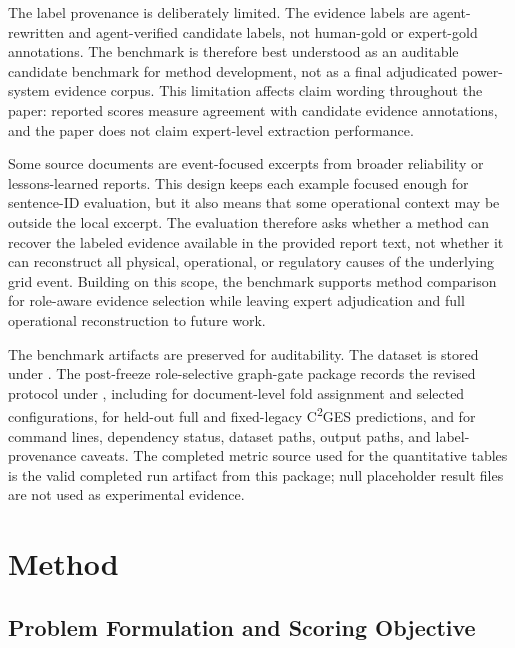 \documentclass{ieeeaccess}
\begin{document}
The label provenance is deliberately limited. The evidence labels are agent-rewritten and agent-verified candidate labels, not human-gold or expert-gold annotations. The benchmark is therefore best understood as an auditable candidate benchmark for method development, not as a final adjudicated power-system evidence corpus. This limitation affects claim wording throughout the paper: reported scores measure agreement with candidate evidence annotations, and the paper does not claim expert-level extraction performance.

Some source documents are event-focused excerpts from broader reliability or lessons-learned reports. This design keeps each example focused enough for sentence-ID evaluation, but it also means that some operational context may be outside the local excerpt. The evaluation therefore asks whether a method can recover the labeled evidence available in the provided report text, not whether it can reconstruct all physical, operational, or regulatory causes of the underlying grid event. Building on this scope, the benchmark supports method comparison for role-aware evidence selection while leaving expert adjudication and full operational reconstruction to future work.

The benchmark artifacts are preserved for auditability. The dataset is stored under . The post-freeze role-selective graph-gate package records the revised protocol under , including  for document-level fold assignment and selected configurations,  for held-out full and fixed-legacy C\textsuperscript{2}GES predictions, and  for command lines, dependency status, dataset paths, output paths, and label-provenance caveats. The completed metric source used for the quantitative tables is the valid completed run artifact from this package; null placeholder result files are not used as experimental evidence.

\section{Method}

\label{sec:method}

\subsection{Problem Formulation and Scoring Objective}
\end{document}

